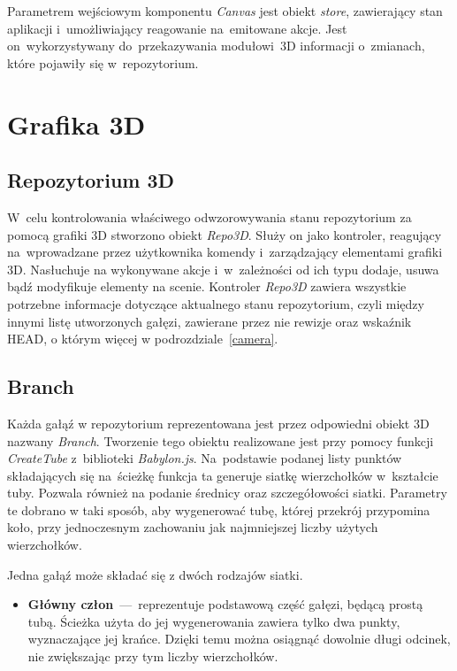 \documentclass[12pt,a4paper,polish,thesis]{dcsbook}
\begin{document}
{	Parametrem wejściowym komponentu \textit{Canvas} jest obiekt \textit{store}, zawierający stan aplikacji i~umożliwiający reagowanie na~emitowane akcje. Jest on~wykorzystywany do~przekazywania modułowi~3D informacji o~zmianach, które pojawiły się w~repozytorium.

	\section{Grafika 3D}

	\subsection{Repozytorium 3D}
	W~celu kontrolowania właściwego odwzorowywania stanu repozytorium za pomocą grafiki 3D stworzono obiekt \textit{Repo3D}. Służy on jako kontroler, reagujący na~wprowadzane przez użytkownika komendy i~zarządzający elementami grafiki 3D. Nasłuchuje na wykonywane akcje i~w~zależności od ich typu dodaje, usuwa bądź modyfikuje elementy na scenie. Kontroler \textit{Repo3D} zawiera wszystkie potrzebne informacje dotyczące aktualnego stanu repozytorium, czyli między innymi listę utworzonych gałęzi, zawierane przez nie rewizje oraz wskaźnik HEAD, o którym więcej w podrozdziale~\ref{camera}.

	\subsection{Branch}
	Każda gałąź w repozytorium reprezentowana jest przez odpowiedni obiekt 3D nazwany \textit{Branch}. Tworzenie tego obiektu realizowane jest przy pomocy funkcji \textit{CreateTube} z~biblioteki \textit{Babylon.js}. Na~podstawie podanej listy punktów składających się na~ścieżkę funkcja ta generuje siatkę wierzchołków w~kształcie tuby. Pozwala również na podanie średnicy oraz szczegółowości siatki. Parametry te dobrano w taki sposób, aby wygenerować tubę, której przekrój przypomina koło, przy jednoczesnym zachowaniu jak najmniejszej liczby użytych wierzchołków. 
	
	Jedna gałąź może składać się z dwóch rodzajów siatki. 
	\begin{itemize}
		\item \textbf{Główny człon}~---~reprezentuje podstawową część gałęzi, będącą prostą tubą. Ścieżka użyta do jej wygenerowania zawiera tylko dwa punkty, wyznaczające jej krańce. Dzięki temu można osiągnąć dowolnie długi odcinek, nie zwiększając przy tym liczby wierzchołków.
		

\end{itemize}}
\end{document}
